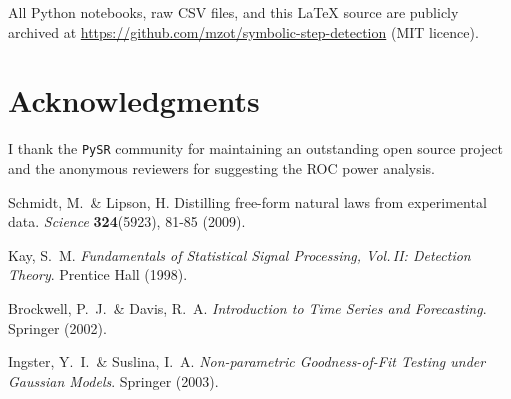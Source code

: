 \documentclass[11pt,a4paper]{article}
\begin{document}
All Python notebooks, raw CSV files, and this \LaTeX{} source are
publicly archived at
\url{https://github.com/mzot/symbolic-step-detection} (MIT licence).

\section*{Acknowledgments}

I thank the \texttt{PySR} community for maintaining an outstanding open
source project and the anonymous reviewers for suggesting the ROC power
analysis.


\begin{thebibliography}{9}
Schmidt, M.\ \& Lipson, H.  
Distilling free-form natural laws from experimental data.  
\emph{Science} \textbf{324}(5923), 81-85 (2009).

Kay, S.~M.  
\emph{Fundamentals of Statistical Signal Processing, Vol.\,II:
Detection Theory}.  Prentice Hall (1998).

Brockwell, P.~J.\ \& Davis, R.~A.  
\emph{Introduction to Time Series and Forecasting}.  Springer (2002).

Ingster, Y.~I.\ \& Suslina, I.~A.  
\emph{Non-parametric Goodness-of-Fit Testing under Gaussian Models}.  
Springer (2003).
\end{thebibliography}
\end{document}

